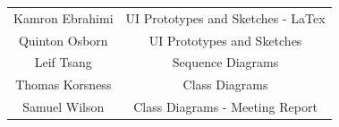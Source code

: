 \documentclass[12pt]{article}
\begin{document}
\begin{center}
\begin{tabular}{ |c|c| }
 \hline
 Kamron Ebrahimi & UI Prototypes and Sketches - LaTex \\
 Quinton Osborn & UI Prototypes and Sketches \\
 Leif Tsang & Sequence Diagrams \\
 Thomas Korsness & Class Diagrams \\
 Samuel Wilson & Class Diagrams - Meeting Report \\
 \hline
\end{tabular}
\end{center}
\end{document}
